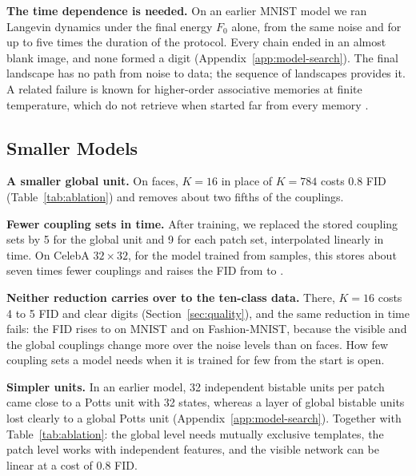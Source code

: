 \documentclass{article}
\newif\ifshownotes
\newcommand{\todo}[1]{\ifshownotes\textcolor{tbdcolor}{[TODO: #1]}\fi}
\begin{document}
\textbf{The time dependence is needed.}
On an earlier MNIST model we ran Langevin dynamics under the final energy
$F_0$ alone, from the same noise and for up to five times the duration of the
protocol. Every chain ended in an almost blank image, and none formed a digit
(Appendix~\ref{app:model-search}). The final landscape has no path from noise
to data; the sequence of landscapes provides it. A related failure is known
for higher-order associative memories at finite temperature, which do not
retrieve when started far from every memory \citep{rooke2026stochastic}.

\subsection{Smaller Models}
\label{sec:smaller}

\textbf{A smaller global unit.}
On faces, $K=16$ in place of $K=784$ costs 0.8 FID
(Table~\ref{tab:ablation}) and removes about two fifths of the couplings.
\todo{coupling counts per noise level from the code; our count is 2.2\,M
against 3.8\,M at $32\times32$.}

\textbf{Fewer coupling sets in time.}
After training, we replaced the \nSlices{} stored coupling sets by 5 for the
global unit and 9 for each patch set, interpolated linearly in time. On
CelebA $32\times32$, for the model trained from samples, this stores about
seven times fewer couplings and raises the FID from \FIDcelebLowSlarge{} to
\FIDknotsCelebLow.
\todo{confirm ``seven times'' with the code's count.}

\textbf{Neither reduction carries over to the ten-class data.}
There, $K=16$ costs 4 to 5 FID and clear digits (Section~\ref{sec:quality}),
and the same reduction in time fails: the FID rises to \FIDknotsMnist{} on
MNIST and \FIDknotsFashion{} on Fashion-MNIST, because the visible and the
global couplings change more over the noise levels than on faces. How few
coupling sets a model needs when it is trained for few from the start is
open.

\textbf{Simpler units.}
In an earlier model, 32 independent bistable units per patch came close to a
Potts unit with 32 states, whereas a layer of global bistable units lost
clearly to a global Potts unit (Appendix~\ref{app:model-search}). Together
with Table~\ref{tab:ablation}: the global level needs mutually exclusive
templates, the patch level works with independent features, and the visible
network can be linear at a cost of 0.8 FID.

\end{document}
